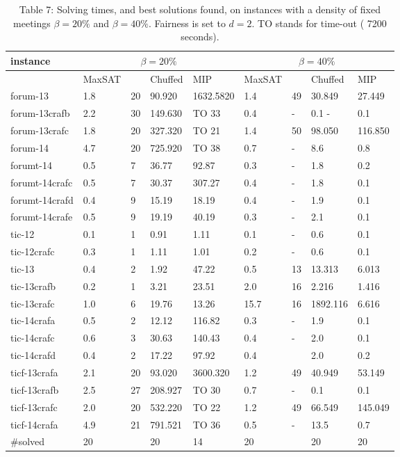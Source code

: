 \documentclass[10pt]{article}
\begin{document}
\begin{table}[h]
\begin{center}
\captionsetup{labelformat=empty}
\caption{Table 7: Solving times, and best solutions found, on instances with a density of fixed meetings $\beta=20 \%$ and $\beta=40 \%$. Fairness is set to $d=2$. TO stands for time-out ( 7200 seconds).}
\begin{tabular}{|l|l|l|l|l|l|l|l|l|}
\hline
\multirow{2}{*}{instance} & \multicolumn{4}{|c|}{$\beta=20 \%$} & \multicolumn{4}{|c|}{$\beta=40 \%$} \\
\hline
 & MaxSAT &  & Chuffed & MIP & MaxSAT &  & Chuffed & MIP \\
\hline
forum-13 & 1.8 & 20 & 90.920 & 1632.5820 & 1.4 & 49 & 30.849 & 27.449 \\
\hline
forum-13crafb & 2.2 & 30 & 149.630 & TO 33 & 0.4 & - & 0.1 - & 0.1 \\
\hline
forum-13crafc & 1.8 & 20 & 327.320 & TO 21 & 1.4 & 50 & 98.050 & 116.850 \\
\hline
forum-14 & 4.7 & 20 & 725.920 & TO 38 & 0.7 & - & 8.6 & 0.8 \\
\hline
forumt-14 & 0.5 & 7 & 36.77 & 92.87 & 0.3 & - & 1.8 & 0.2 \\
\hline
forumt-14crafc & 0.5 & 7 & 30.37 & 307.27 & 0.4 & - & 1.8 & 0.1 \\
\hline
forumt-14crafd & 0.4 & 9 & 15.19 & 18.19 & 0.4 & - & 1.9 & 0.1 \\
\hline
forumt-14crafe & 0.5 & 9 & 19.19 & 40.19 & 0.3 & - & 2.1 & 0.1 \\
\hline
tic-12 & 0.1 & 1 & 0.91 & 1.11 & 0.1 & - & 0.6 & 0.1 \\
\hline
tic-12crafc & 0.3 & 1 & 1.11 & 1.01 & 0.2 & - & 0.6 & 0.1 \\
\hline
tic-13 & 0.4 & 2 & 1.92 & 47.22 & 0.5 & 13 & 13.313 & 6.013 \\
\hline
tic-13crafb & 0.2 & 1 & 3.21 & 23.51 & 2.0 & 16 & 2.216 & 1.416 \\
\hline
tic-13crafc & 1.0 & 6 & 19.76 & 13.26 & 15.7 & 16 & 1892.116 & 6.616 \\
\hline
tic-14crafa & 0.5 & 2 & 12.12 & 116.82 & 0.3 & - & 1.9 & 0.1 \\
\hline
tic-14crafc & 0.6 & 3 & 30.63 & 140.43 & 0.4 & - & 2.0 & 0.1 \\
\hline
tic-14crafd & 0.4 & 2 & 17.22 & 97.92 & 0.4 &  & 2.0 & 0.2 \\
\hline
ticf-13crafa & 2.1 & 20 & 93.020 & 3600.320 & 1.2 & 49 & 40.949 & 53.149 \\
\hline
ticf-13crafb & 2.5 & 27 & 208.927 & TO 30 & 0.7 & - & 0.1 & 0.1 \\
\hline
ticf-13crafc & 2.0 & 20 & 532.220 & TO 22 & 1.2 & 49 & 66.549 & 145.049 \\
\hline
ticf-14crafa & 4.9 & 21 & 791.521 & TO 36 & 0.5 & - & 13.5 & 0.7 \\
\hline
\#solved & 20 &  & 20 & 14 & 20 &  & 20 & 20 \\
\hline
\end{tabular}
\end{center}
\end{table}
\end{document}
